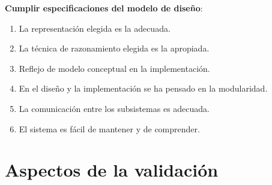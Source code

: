 \documentclass[12pt]{article}
\begin{document}
\textbf{Cumplir especificaciones del modelo de diseño}:
\begin{enumerate}
\item La representación elegida es la adecuada.
\item La técnica de razonamiento elegida es la apropiada.
\item Reflejo de modelo conceptual en la implementación.
\item En el diseño y la implementación se ha pensado en la modularidad.
\item La comunicación entre los subsistemas es adecuada.
\item El sistema es fácil de mantener y de comprender.
\end{enumerate}

\section{Aspectos de la validación}
\end{document}

